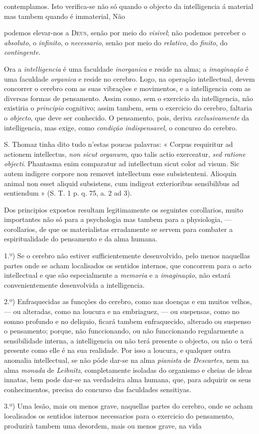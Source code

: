 contemplamos. Isto verifica-se não só quando o objecto da intelligencia á material mas tambem quando é immaterial, Não\par *podemos elevar-nos a \textsc{Deus}, senão por meio do \emph{visivel}; não podemos perceber o \emph{absoluto}, o \emph{infinito}, o \emph{necessario}, senão por meio do \emph{relativo}, do \emph{finito}, do \emph{contingente}.\par Ora a \emph{intelligencia} é uma faculdade \emph{inorganica} e reside na alma; a \emph{imaginação} é uma faculdade \emph{organica} e reside no cerebro. Logo, na operação intellectual, devem concorrer o cerebro com as suas vibrações e movimentos, e a intelligencia com as diversas formas de pensamento. Assim como, sem o exercicio da intelligencia, não existiria o \emph{principio} cognitivo; assim tambem, sem o exercicio do cerebro, faltaria o \emph{objecto}, que deve ser conhecido. O pensamento, pois, deriva \emph{exclusivamente} da intelligencia, mas exige, como \emph{condição indispensavel}, o concurso do cerebro.\par S. Thomaz tinha dito tudo n'estas poucas palavras: « Corpus requiritur ad actionem intellectus, \emph{non sicut organwm}, quo talis actio exerceatur, \emph{sed ratione objecti}. Phantasma enim comparatur ad intellectum sicut color ad visum. Sic autem indigere corpore non removet intellectum esse subsistenteni. Alioquin animal non esset aliquid subsistens, cum indigeat exterioribus sensibilibus ad sentiendum » (S. T. 1 p. q. 75, a. 2 ad 3).\par Dos principios expostos resultam legitimamente os seguintes corollarios, muito importantes não só para a psychologia mas tambem para a physiologia, --- corollarios, de que os materialistas erradamente se servem para combater a espiritualidade do pensamento e da alma humana.\par 1.º) Se o cerebro não estiver sufficientemente desenvolvido, pelo menos naquellas partes onde se acham localisados os sentidos internos, que concorrem para o acto intellectual e que são especialmente a \emph{memoria} e a \emph{imaginação}, não estará convenientemente desenvolvida a intelligencia.\par 2.º) Enfraquecidas as funcções do cerebro, como nas doenças e em muitos velhos, --- ou alteradas, como na loucura e na embriaguez, --- ou suspensas, como no somno profundo e no deliquio, ficará tambem enfraquecido, alterado ou suspenso o pensamento; porque, não funccionando, ou não funccionando regularmente a sensibilidade interna, a intelligencia ou não terá presente o objecto, ou não o terá presente como elle é na sua realidade. Por isso a loucura, e qualquer outra anomalia intellectual, se não póde dar-se na alma \emph{pianista} de \emph{Descartes}, nem na alma \emph{monada} de \emph{Leibnitz}, completamente isoladas do organismo e cheias de ideas innatas, bem pode dar-se na verdadeira alma humana, que, para adquirir os seus conhecimentos, precisa do concurso das faculdades sensitiyas.\par 3.º) Uma lesão, mais ou menos grave, naquellas partes do cerebro, onde se acham loealisados os sentidos internos necessarios para o exercicio do pensamento, produzirà tambem uma desordem, mais ou menos grave, na vida 